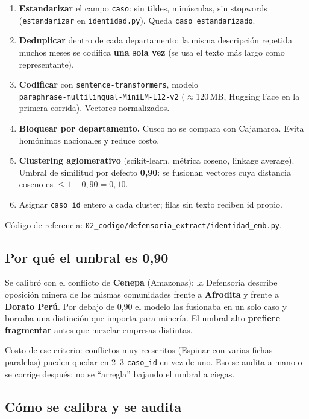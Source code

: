 \documentclass[11pt,a4paper]{article}
\begin{document}
\begin{enumerate}
  \item \textbf{Estandarizar} el campo \texttt{caso}: sin tildes, minúsculas, sin stopwords (\texttt{estandarizar} en \texttt{identidad.py}). Queda \texttt{caso\_estandarizado}.
  \item \textbf{Deduplicar} dentro de cada departamento: la misma descripción repetida muchos meses se codifica \textbf{una sola vez} (se usa el texto más largo como representante).
  \item \textbf{Codificar} con \texttt{sentence-transformers}, modelo\\
  \texttt{paraphrase-multilingual-MiniLM-L12-v2} ($\approx$120\,MB, Hugging Face en la primera corrida). Vectores normalizados.
  \item \textbf{Bloquear por departamento.} Cusco no se compara con Cajamarca. Evita homónimos nacionales y reduce costo.
  \item \textbf{Clustering aglomerativo} (scikit-learn, métrica coseno, linkage average). Umbral de similitud por defecto \textbf{0{,}90}: se fusionan vectores cuya distancia coseno es $\le 1-0{,}90=0{,}10$.
  \item Asignar \texttt{caso\_id} entero a cada cluster; filas sin texto reciben id propio.
\end{enumerate}

Código de referencia: \texttt{02\_codigo/defensoria\_extract/identidad\_emb.py}.

\subsection{Por qué el umbral es 0{,}90}

Se calibró con el conflicto de \textbf{Cenepa} (Amazonas): la Defensoría describe oposición minera de las mismas comunidades frente a \textbf{Afrodita} y frente a \textbf{Dorato Perú}. Por debajo de 0{,}90 el modelo las fusionaba en un solo caso y borraba una distinción que importa para minería. El umbral alto \textbf{prefiere fragmentar} antes que mezclar empresas distintas.

Costo de ese criterio: conflictos muy reescritos (Espinar con varias fichas paralelas) pueden quedar en 2--3 \texttt{caso\_id} en vez de uno. Eso se audita a mano o se corrige después; no se ``arregla'' bajando el umbral a ciegas.

\subsection{Cómo se calibra y se audita}
\end{document}
